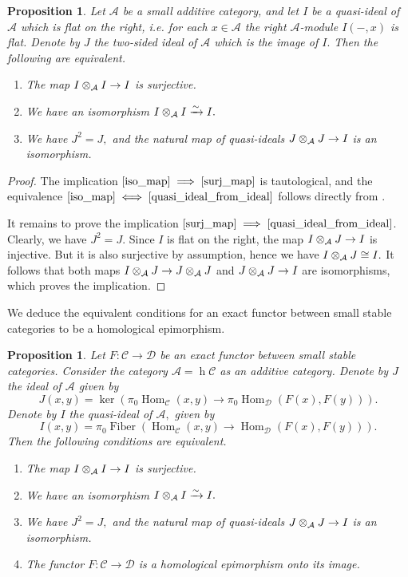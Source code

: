 \documentclass[11pt,leqno]{amsart}
\newcommand{\Implies}[2]{$\text{\ref{#1}}\implies\text{\ref{#2}}$}
\newcommand{\Iff}[2]{$\text{\ref{#1}}\iff\text{\ref{#2}}$}
\newtheorem{prop}[theo]{Proposition}
\numberwithin{equation}{section}
\def\h{\operatorname{h}}
\def\Hom{\operatorname{Hom}}
\newcommand{\tens}[1]{%
  \mathbin{\mathop{\otimes}\displaylimits_{#1}}%
}
\newcommand{\xto}{\xrightarrow}
\newcommand{\Fiber}{\operatorname{Fiber}}
\newcommand{\cD}{{\mathcal D}}
\newcommand{\cA}{{\mathcal A}}
\newcommand{\cC}{{\mathcal C}}
\begin{document}
\begin{prop}\label{prop:idempotent_quasi_ideals}
Let $\cA$ be a small additive category, and let $I$ be a quasi-ideal of $\cA$ which is flat on the right, i.e. for each $x\in\cA$ the right $\cA$-module $I(-,x)$ is flat. Denote by $J$ the two-sided ideal of $\cA$ which is the image of $I.$ Then the following are equivalent.
\begin{enumerate}[label=(\roman*),ref=(\roman*)]
 \item The map $I\tens{\cA}I\to I$ is surjective. \label{surj_map}
 \item We have an isomorphism $I\tens{\cA}I\xto{\sim} I.$ \label{iso_map}
 \item We have $J^2=J,$ and the natural map of quasi-ideals $J\tens{\cA}J\to I$ is an isomorphism. \label{quasi_ideal_from_ideal}
\end{enumerate}
\end{prop}

\begin{proof} 
The implication \Implies{iso_map}{surj_map} is tautological, and the equivalence \Iff{iso_map}{quasi_ideal_from_ideal} follows directly from \cite[Lemma 1.47]{E24}.

It remains to prove the implication \Implies{surj_map}{quasi_ideal_from_ideal}. Clearly, we have $J^2=J.$ Since $I$ is flat on the right, the map
$I\tens{\cA}J\to I$ is injective. But it is also surjective by assumption, hence we have $I\tens{\cA}J\cong I.$ It follows that both maps $I\tens{\cA}J\to J\tens{\cA}J$ and $J\tens{\cA}J\to I$ are isomorphisms, which proves the implication.
\end{proof}

We deduce the equivalent conditions for an exact functor between small stable categories to be a homological epimorphism. 

\begin{prop}
Let $F:\cC\to\cD$ be an exact functor between small stable categories. Consider the category $\cA=\h\cC$ as an additive category. Denote by $J$ the ideal of $\cA$ given by
\begin{equation*}
J(x,y)=\ker(\pi_0\Hom_{\cC}(x,y)\to\pi_0\Hom_{\cD}(F(x),F(y))).
\end{equation*}
Denote by $I$ the quasi-ideal of $\cA,$ given by 
\begin{equation*}
I(x,y)=\pi_0\Fiber(\Hom_{\cC}(x,y)\to \Hom_{\cD}(F(x),F(y))).
\end{equation*}
Then the following conditions are equivalent.
\begin{enumerate}[label=(\roman*), ref=(\roman*)]
\item The map $I\tens{\cA}I\to I$ is surjective.\label{surj_map1}
\item We have an isomorphism $I\tens{\cA}I\xto{\sim} I.$ \label{iso_map1}
\item We have $J^2=J,$ and the natural map of quasi-ideals $J\tens{\cA}J\to I$ is an isomorphism. \label{quasi_ideal_from_ideal1}
\item The functor $F:\cC\to\cD$ is a homological epimorphism onto its image. \label{hom_epi_onto_image}
\end{enumerate}
\end{prop}
\end{document}
